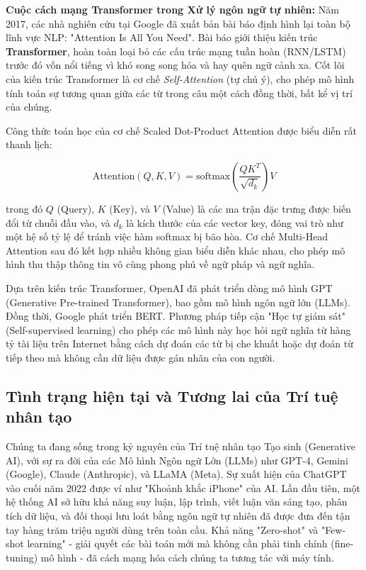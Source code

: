 \textbf{Cuộc cách mạng Transformer trong Xử lý ngôn ngữ tự nhiên:}
Năm 2017, các nhà nghiên cứu tại Google đã xuất bản bài báo định hình lại toàn bộ lĩnh vực NLP: "Attention Is All You Need". Bài báo giới thiệu kiến trúc \textbf{Transformer}, hoàn toàn loại bỏ các cấu trúc mạng tuần hoàn (RNN/LSTM) trước đó vốn nổi tiếng vì khó song song hóa và hay quên ngữ cảnh xa. Cốt lõi của kiến trúc Transformer là cơ chế \textit{Self-Attention} (tự chú ý), cho phép mô hình tính toán sự tương quan giữa các từ trong câu một cách đồng thời, bất kể vị trí của chúng.

Công thức toán học của cơ chế Scaled Dot-Product Attention được biểu diễn rất thanh lịch:

\begin{equation}
\text{Attention}(Q, K, V) = \text{softmax}\left(\frac{QK^T}{\sqrt{d_k}}\right)V
\end{equation}

trong đó $Q$ (Query), $K$ (Key), và $V$ (Value) là các ma trận đặc trưng được biến đổi từ chuỗi đầu vào, và $d_k$ là kích thước của các vector key, đóng vai trò như một hệ số tỷ lệ để tránh việc hàm softmax bị bão hòa. Cơ chế Multi-Head Attention sau đó kết hợp nhiều không gian biểu diễn khác nhau, cho phép mô hình thu thập thông tin vô cùng phong phú về ngữ pháp và ngữ nghĩa.

Dựa trên kiến trúc Transformer, OpenAI đã phát triển dòng mô hình GPT (Generative Pre-trained Transformer), bao gồm mô hình ngôn ngữ lớn (LLMs). Đồng thời, Google phát triển BERT. Phương pháp tiếp cận "Học tự giám sát" (Self-supervised learning) cho phép các mô hình này học hỏi ngữ nghĩa từ hàng tỷ tài liệu trên Internet bằng cách dự đoán các từ bị che khuất hoặc dự đoán từ tiếp theo mà không cần dữ liệu được gán nhãn của con người.

\newpage

\subsection{Tình trạng hiện tại và Tương lai của Trí tuệ nhân tạo}

Chúng ta đang sống trong kỷ nguyên của Trí tuệ nhân tạo Tạo sinh (Generative AI), với sự ra đời của các Mô hình Ngôn ngữ Lớn (LLMs) như GPT-4, Gemini (Google), Claude (Anthropic), và LLaMA (Meta). Sự xuất hiện của ChatGPT vào cuối năm 2022 được ví như "Khoảnh khắc iPhone" của AI. Lần đầu tiên, một hệ thống AI sở hữu khả năng suy luận, lập trình, viết luận văn sáng tạo, phân tích dữ liệu, và đối thoại lưu loát bằng ngôn ngữ tự nhiên đã được đưa đến tận tay hàng trăm triệu người dùng trên toàn cầu. Khả năng "Zero-shot" và "Few-shot learning" - giải quyết các bài toán mới mà không cần phải tinh chỉnh (fine-tuning) mô hình - đã cách mạng hóa cách chúng ta tương tác với máy tính.

